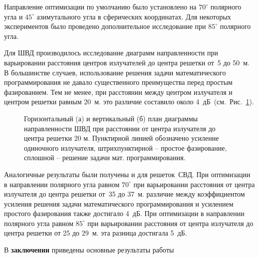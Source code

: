 Направление оптимизации по умолчанию было установлено на $70^{\circ}$ полярного угла и $45^{\circ}$ азимутального угла в сферических координатах. Для некоторых экспериментов было проведено дополнительное исследование при $85^{\circ}$ полярного угла.


Для ШВД производилось исследование диаграмм направленности при варьировании расстояния центров излучателей до центра решетки от~5 до 50~м. В большинстве случаев, использование решения задачи математического программирования не давало существенного преимущества перед простым фазированием. Тем не менее, при расстоянии между центром излучателя и центром решетки равным 20~м. это различие составило около 4~дБ~(см.~Рис.~\ref{pic:r_bvd_result_0}).

\begin{figure}
\begin{minipage}[h]{0.49\linewidth}
\end{minipage}
\hfill
\begin{minipage}[h]{0.49\linewidth}
\end{minipage}
\caption{Горизонтальный (а) и вертикальный (б) план диаграммы направленности ШВД при расстоянии от центра излучателя до центра решетки 20 м. Пунктирной линией обозначено усиление одиночного излучателя, штрихпунктирной – простое фазирование, сплошной – решение задачи мат. программирования.}
\label{pic:r_bvd_result_0}
\end{figure}

Аналогичные результаты были получены и для решеток~СВД. При оптимизации в направлении полярного угла равном $70^{\circ}$ при варьировании расстояния от центра излучателя до центра решетки от~35 до 37~м. различие между коэффициентом усиления решения задачи математического программирования и усилением простого фазирования также достигало 4~дБ.  При оптимизации в направлении полярного угла равном $85^{\circ}$ при варьировании расстояния от центра излучателя до центра решетки от 25 до 29~м. эта разница достигала 5~дБ.

\FloatBarrier
{}                                  %
В {\textbf{заключении}} приведены основные результаты работы

